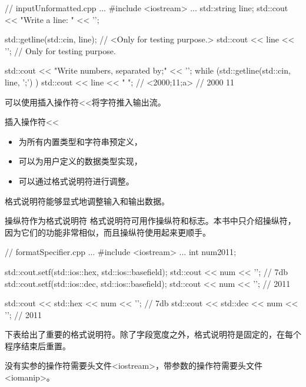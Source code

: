 \begin{cpp}
// inputUnformatted.cpp
...
#include <iostream>
...
std::string line;
std::cout << "Write a line: " << '\n';

std::getline(std::cin, line); // <Only for testing purpose.>
std::cout << line << '\n'; // Only for testing purpose.

std::cout << "Write numbers, separated by;" << '\n';
while (std::getline(std::cin, line, ';') ) {
	std::cout << line << " ";
} // <2000;11;a>
  // 2000 11
\end{cpp}



可以使用插入操作符<{}<将字符推入输出流。

插入操作符<{}<

\begin{itemize}
\item 
为所有内置类型和字符串预定义，

\item 
可以为用户定义的数据类型实现，

\item 
可以通过格式说明符进行调整。
\end{itemize}



格式说明符能够显式地调整输入和输出数据。

\begin{myNotic}{操纵符作为格式说明符}
格式说明符可用作操纵符和标志。本书中只介绍操纵符，因为它们的功能非常相似，而且操纵符使用起来更顺手。


\begin{cpp}
// formatSpecifier.cpp
...
#include <iostream>
...
int num{2011};

std::cout.setf(std::ios::hex, std::ios::basefield);
std::cout << num << '\n'; // 7db
std::cout.setf(std::ios::dec, std::ios::basefield);
std::cout << num << '\n'; // 2011

std::cout << std::hex << num << '\n'; // 7db
std::cout << std::dec << num << '\n'; // 2011
\end{cpp}

\end{myNotic}

下表给出了重要的格式说明符。除了字段宽度之外，格式说明符是固定的，在每个程序结束后重置。

没有实参的操作符需要头文件<iostream>，带参数的操作符需要头文件<iomanip>。

